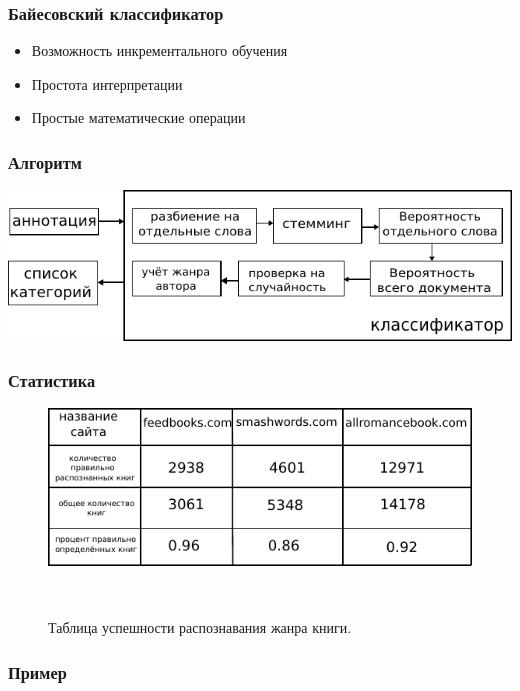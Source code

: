 \documentclass[utf8,handout]{beamer}
\begin{document}
\begin{frame}
	\frametitle{Байесовский классификатор}
	  \begin{itemize}
	    \item Возможность инкрементального обучения
	    \item Простота интерпретации
	    \item Простые математические операции
	  \end{itemize}
	   		  
\end{frame}


\begin{frame}
	\frametitle{Алгоритм}
      \includegraphics[width=1.05\textwidth]{./classifier}
\end{frame}


\begin{frame}
	\frametitle{Статистика}
   \begin{figure}
	  \centering
	  \includegraphics[width=.7\textwidth]{./statistics}
	  
	  \ 
	  \ 
	  
	  Таблица успешности распознавания жанра книги.
   \end{figure} 
\end{frame}

\begin{frame}
	\frametitle{Пример}
    
    
    
\end{frame}
\end{document}

